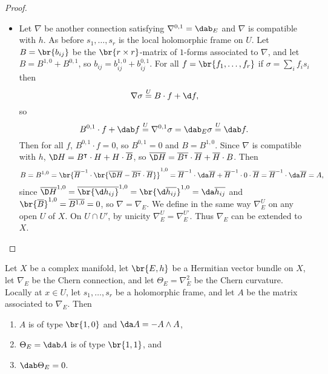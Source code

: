 \begin{proof}
\begin{itemize}
\item Let $ \nabla $ be another connection satisfying $ \nabla^{0, 1} = \dab_E $ and $ \nabla $ is compatible with $ h $. As before $ s_1, \dots, s_r $ is the local holomorphic frame on $ U $. Let $ B = \br{b_{ij}} $ be the $ \br{r \times r} $-matrix of $ 1 $-forms associated to $ \nabla $, and let $ B = B^{1, 0} + B^{0, 1} $, so $ b_{ij} = b_{ij}^{1, 0} + b_{ij}^{0, 1} $. For all $ f = \br{f_1, \dots, f_r} $ if $ \sigma = \sum_i f_is_i $ then
$$ \nabla\sigma \overset{U}{=} B \cdot f + \d f, $$
so
$$ B^{0, 1} \cdot f + \dab f \overset{U}{=} \nabla^{0, 1}\sigma = \dab_E\sigma \overset{U}{=} \dab f. $$
Then for all $ f $, $ B^{0, 1} \cdot f = 0 $, so $ B^{0, 1} = 0 $ and $ B = B^{1, 0} $. Since $ \nabla $ is compatible with $ h $, $ \D H = B^\intercal \cdot H + H \cdot \overline{B} $, so $ \overline{\D H} = \overline{B^\intercal} \cdot \overline{H} + \overline{H} \cdot B $. Then
$$ B = B^{1, 0} = \br{\overline{H}^{-1} \cdot \br{\overline{\D H} - \overline{B^\intercal} \cdot \overline{H}}}^{1, 0} = \overline{H}^{-1} \cdot \da\overline{H} + \overline{H}^{-1} \cdot 0 \cdot \overline{H} = \overline{H}^{-1} \cdot \da\overline{H} = A, $$
since $ \overline{\D H}^{1, 0} = \overline{\br{\d h_{ij}}}^{1, 0} = \br{\d \overline{h_{ij}}}^{1, 0} = \da\overline{h_{ij}} $ and $ \br{\overline{B}}^{1, 0} = \overline{B^{1, 0}} = 0 $, so $ \nabla = \nabla_E $. We define in the same way $ \nabla_E^U $ on any open $ U $ of $ X $. On $ U \cap U' $, by unicity $ \nabla_E^U = \nabla_E^{U'} $. Thus $ \nabla_E $ can be extended to $ X $.
\end{itemize}
\end{proof}

\begin{corollary}
\label{cor:5.11}
Let $ X $ be a complex manifold, let $ \br{E, h} $ be a Hermitian vector bundle on $ X $, let $ \nabla_E $ be the Chern connection, and let $ \Theta_E = \nabla_E^2 $ be the Chern curvature. Locally at $ x \in U $, let $ s_1, \dots, s_r $ be a holomorphic frame, and let $ A $ be the matrix associated to $ \nabla_E $. Then
\begin{enumerate}
\item $ A $ is of type $ \br{1, 0} $ and $ \da A = -A \wedge A $,
\item $ \Theta_E = \dab A $ is of type $ \br{1, 1} $, and
\item $ \dab\Theta_E = 0 $.
\end{enumerate}
\end{corollary}

